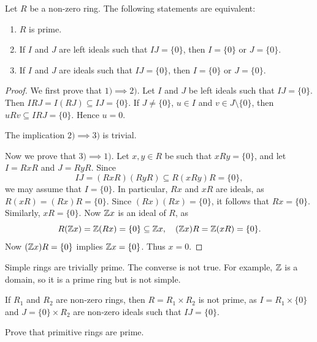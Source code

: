 \begin{proposition}
    Let $R$ be a non-zero ring. The following statements are equivalent:
	\begin{enumerate}
		\item $R$ is prime.
		\item If $I$ and $J$ are left ideals such that $IJ=\{0\}$, then 
			$I=\{0\}$ or $J=\{0\}$.
		\item If $I$ and $J$ are ideals such that $IJ=\{0\}$, then $I=\{0\}$ or
			$J=\{0\}$.
	\end{enumerate}
\end{proposition}

\begin{proof}
	We first prove that $1)\implies2)$. Let $I$ and $J$ be left ideals such that
	$IJ=\{0\}$. Then $IRJ=I(RJ)\subseteq IJ=\{0\}$. If $J\ne
	\{0\}$, $u\in I$ and $v\in J\setminus\{0\}$, then $uRv\subseteq IRJ=\{0\}$. Hence 
	$u=0$.

	The implication $2)\implies3)$ is trivial. 

    Now we prove that $3)\implies1)$. Let $x,y\in R$ be such that $xRy=\{0\}$, and 
	let $I=RxR$ and $J=RyR$. Since 
    \[
    IJ=(RxR)(RyR)\subseteq R(xRy)R=\{0\},
    \]
	we may assume that $I=\{0\}$. In particular, $Rx$ and $xR$ are ideals, as 
	$R(xR)=(Rx)R=\{0\}$. Since $(Rx)(Rx)=\{0\}$, it follows that 
    $Rx=\{0\}$. Similarly, $xR=\{0\}$. Now $\mathbb{Z} x$ is an ideal of $R$, as 
    \[
    R(\mathbb{Z} x)=\mathbb{Z}(Rx)=\{0\}\subseteq\mathbb{Z} x,\quad 
    (\mathbb{Z} x)R=\mathbb{Z}(xR)=\{0\}.
    \]
    Now $(\mathbb{Z} x)R=\{0\}$ implies $\mathbb{Z} x=\{0\}$. 
	Thus $x=0$. 
\end{proof}

Simple rings are trivially prime. The converse is not true. For example,
$\mathbb{Z}$ is a domain, so it is a prime ring but is not simple.

\begin{example}
	If $R_1$ and $R_2$ are non-zero rings, then $R=R_1\times R_2$ is not prime, as 
	$I=R_1\times\{0\}$ and $J=\{0\}\times R_2$ are non-zero ideals such that $IJ=\{0\}$.
\end{example}

\begin{exercise}
    \label{xca:primitive=>prime}
    Prove that primitive rings are prime.
\end{exercise}



